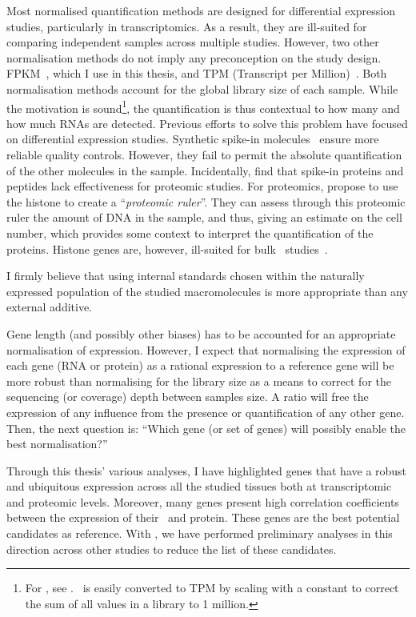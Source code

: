 Most normalised quantification methods are designed
for differential expression studies,
particularly in transcriptomics.
As a result, they are ill-suited
for comparing independent samples across multiple studies.
However, two other normalisation methods
do not imply any preconception on the study design.
\gls{FPKM}~,
which I use in this thesis,
and TPM (Transcript per Million)~.
Both normalisation methods account for the global library size of each sample.
While the motivation is sound\footnote{For \FPKM, see .
\FPKM\ is easily converted to TPM by scaling with a constant
to correct the sum of all values in a library to 1 million.
},
the quantification is thus contextual
to %
how many
and how much \glspl{RNA} are detected.
Previous efforts to solve this problem have focused
on differential expression studies.
Synthetic spike-in molecules~
ensure more reliable quality controls.
However, they fail to permit the absolute quantification
of the other molecules in the sample.
Incidentally, \citet{Rudnick2014-ar} find that spike-in proteins and peptides
lack effectiveness for proteomic studies.
For proteomics, \citet{Wisniewski2014-kh} propose
to use the histone to create a \enquote{\emph{proteomic ruler}}.
They can assess through this proteomic ruler the amount of \gls{DNA}
in the sample, and thus, giving an estimate on the cell number,
which provides some context to interpret the quantification of the proteins.
Histone genes are, however, ill-suited
for bulk \Rnaseq\ studies~.

I firmly believe that using internal standards chosen
within the naturally expressed population of the studied macromolecules
is more appropriate than any external additive.

Gene length (and possibly other biases)
has to be accounted for an appropriate normalisation of expression.
However, I expect that normalising the expression of each gene (RNA or protein)
as a rational expression to a reference gene will be more robust
than normalising for the library size as a means to correct
for the sequencing (or coverage) depth between samples size.
A ratio will free the expression of any influence
from the presence or quantification of any other gene.
Then, the next question is:
\enquote{Which gene (or set of genes) will possibly enable the best normalisation?}

Through this thesis' various analyses,
I have highlighted genes that have a robust and ubiquitous expression
across all the studied tissues
both at transcriptomic and proteomic levels.
Moreover, many genes present high correlation coefficients
between the expression of their \mRNA\ and protein.
These genes are the best potential candidates as reference.
With \nuno, we have performed preliminary analyses
in this direction across other studies
to reduce the list of these candidates.

